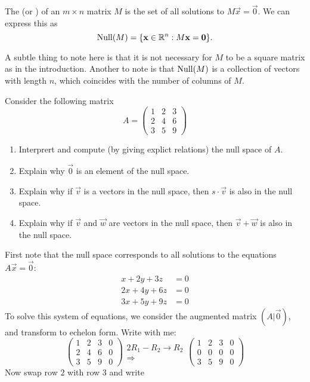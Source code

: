 \documentclass{ximera}
\begin{document}
\begin{definition}
  The  (or ) of an $m \times n$ matrix $M$ is
  the set of all solutions to $M\vec{x} = \vec{0}$. We can express
  this as
  \[
    \operatorname{Null}(M) = \{ \mathbf{x}\in\mathbb{R}^n: M\mathbf{x} = \mathbf{0}\}.
  \]
\end{definition}

\begin{remark}
  A subtle thing to note here is that it is not necessary for $M$ to be
  a square matrix as in the introduction. Another to note is that
  $\operatorname{Null}(M)$ is a collection of vectors with length $n$, which coincides
  with the number of columns of $M$.
\end{remark}

\begin{example}
  Consider the following matrix
  \[
    A = \begin{pmatrix}
      1 & 2 & 3 \\
      2 & 4 & 6 \\
      3 & 5 & 9
    \end{pmatrix}
  \]
  \begin{enumerate}
    \item Interprert and compute (by giving explict relations) the null space
          of
          $A$.
    \item Explain why $\vec{0}$ is an element of the null space.
    \item Explain why if $\vec{v}$ is a vectors in the null space, then $s\cdot
            \vec{v}$ is also in the null space.
    \item Explain why if $\vec{v}$ and $\vec{w}$ are vectors in the null space,
          then $\vec{v} + \vec{w}$ is also in the null space.
  \end{enumerate}
  \begin{explanation}
    First note that the null space corresponds to all solutions to the
    equations
    $A\vec{x} = \vec{0}$:
    \begin{align*}
      x + 2y + 3z  & = 0 \\
      2x +4y + 6z  & = 0 \\
      3x + 5y + 9z & =0
    \end{align*}
    To solve this system of equations, we consider the augmented matrix
    $(A|\vec{0})$, and transform to echelon form. Write with me:
    \[
      \begin{pmatrix}
        1 & 2 & 3 & 0 \\
        2 & 4 & 6 & 0 \\
        3 & 5 & 9 & 0
      \end{pmatrix}
      \begin{matrix}	  \scriptstyle 2R_1-R_2\rightarrow R_2
        \\\Longrightarrow
      \end{matrix}
      \begin{pmatrix}
        1 & 2 & 3 & 0 \\
        0 & 0 & 0 & 0 \\
        3 & 5 & 9 & 0
      \end{pmatrix}
    \]
    Now swap row $2$ with row $3$ and write


\end{explanation}
\end{example}
\end{document}
